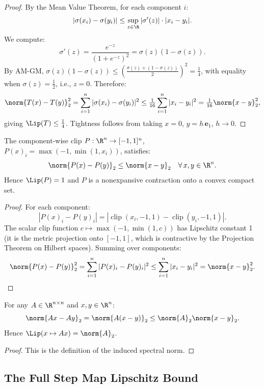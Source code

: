 \documentclass[11pt,letterpaper]{article}
\theoremstyle{pirtmthm}
\theoremstyle{remark}
\begin{document}
\begin{proof}
By the Mean Value Theorem, for each component $i$:
\[
  |\sigma(x_i) - \sigma(y_i)| \leq \sup_{z \in \R} |\sigma'(z)| \cdot |x_i - y_i|.
\]
We compute:
\[
  \sigma'(z) = \frac{e^{-z}}{(1+e^{-z})^2} = \sigma(z)(1-\sigma(z)).
\]
By AM-GM, $\sigma(z)(1-\sigma(z)) \leq \left(\frac{\sigma(z)+(1-\sigma(z))}{2}\right)^2 = \frac{1}{4}$,
with equality when $\sigma(z) = \tfrac{1}{2}$, i.e., $z = 0$.
Therefore:
\[
  \norm{T(x)-T(y)}_2^2 = \sum_{i=1}^n |\sigma(x_i)-\sigma(y_i)|^2
  \leq \tfrac{1}{16}\sum_{i=1}^n |x_i-y_i|^2 = \tfrac{1}{16}\norm{x-y}_2^2,
\]
giving $\Lip(T) \leq \tfrac{1}{4}$.
Tightness follows from taking $x = 0$, $y = h\,\mathbf{e}_1$, $h \to 0$.
\end{proof}

\begin{lemma}
\label{lem:proj-nonexp}
The component-wise clip $P : \R^n \to [-1,1]^n$,
$P(x)_i = \max(-1,\min(1,x_i))$, satisfies:
\[
  \norm{P(x) - P(y)}_2 \leq \norm{x-y}_2 \quad \forall\, x, y \in \R^n.
\]
Hence $\Lip(P) = 1$ and $P$ is a nonexpansive contraction onto a
convex compact set.
\end{lemma}

\begin{proof}
For each component:
\[
  |P(x)_i - P(y)_i| = |\operatorname{clip}(x_i,-1,1) - \operatorname{clip}(y_i,-1,1)|.
\]
The scalar clip function $c \mapsto \max(-1,\min(1,c))$ has Lipschitz
constant 1 (it is the metric projection onto $[-1,1]$, which is
contractive by the Projection Theorem on Hilbert spaces). Summing
over components:
\[
  \norm{P(x)-P(y)}_2^2 = \sum_{i=1}^n |P(x)_i - P(y)_i|^2
  \leq \sum_{i=1}^n |x_i - y_i|^2 = \norm{x-y}_2^2. \qedhere
\]
\end{proof}

\begin{lemma}
\label{lem:linear}
For any $A \in \R^{n \times n}$ and $x, y \in \R^n$:
\[
  \norm{Ax - Ay}_2 = \norm{A(x-y)}_2 \leq \norm{A}_2 \norm{x-y}_2.
\]
Hence $\Lip(x \mapsto Ax) = \norm{A}_2$.
\end{lemma}

\begin{proof}
This is the definition of the induced spectral norm.
\end{proof}

\subsection{The Full Step Map Lipschitz Bound}
\end{document}
